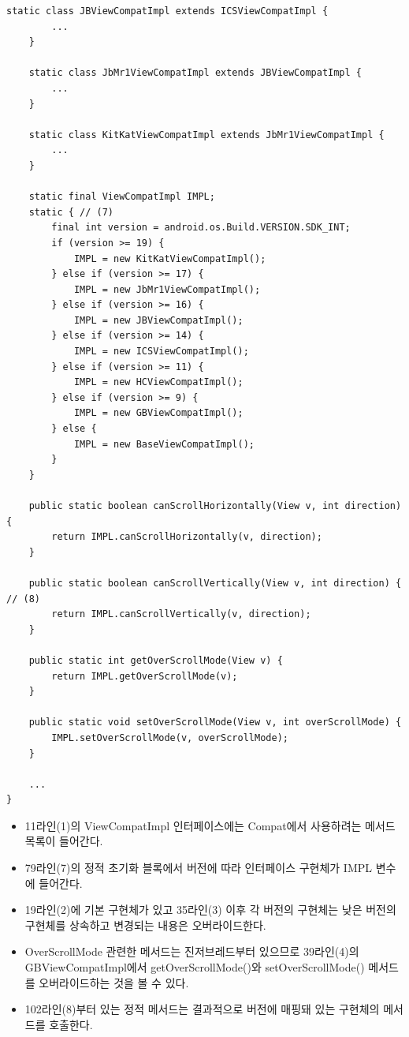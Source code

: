 \begin{lstlisting}[frame=single]
    static class JBViewCompatImpl extends ICSViewCompatImpl {
        ...
    }

    static class JbMr1ViewCompatImpl extends JBViewCompatImpl {
    	...
    }

    static class KitKatViewCompatImpl extends JbMr1ViewCompatImpl {
        ...
    }

    static final ViewCompatImpl IMPL;
    static { // (7)
        final int version = android.os.Build.VERSION.SDK_INT;
        if (version >= 19) {
            IMPL = new KitKatViewCompatImpl();
        } else if (version >= 17) {
            IMPL = new JbMr1ViewCompatImpl();
        } else if (version >= 16) {
            IMPL = new JBViewCompatImpl();
        } else if (version >= 14) {
            IMPL = new ICSViewCompatImpl();
        } else if (version >= 11) {
            IMPL = new HCViewCompatImpl();
        } else if (version >= 9) {
            IMPL = new GBViewCompatImpl();
        } else {
            IMPL = new BaseViewCompatImpl();
        }
    }

    public static boolean canScrollHorizontally(View v, int direction) {
        return IMPL.canScrollHorizontally(v, direction);
    }

    public static boolean canScrollVertically(View v, int direction) { // (8)
        return IMPL.canScrollVertically(v, direction);
    }

    public static int getOverScrollMode(View v) {
        return IMPL.getOverScrollMode(v);
    }

    public static void setOverScrollMode(View v, int overScrollMode) {
        IMPL.setOverScrollMode(v, overScrollMode);
    }

 	...
}

\end{lstlisting}
\begin{itemize}
\item 11라인(1)의 ViewCompatImpl 인터페이스에는 Compat에서 사용하려는 메서드 목록이 들어간다. 
\item 79라인(7)의 정적 초기화 블록에서 버전에 따라 인터페이스 구현체가 IMPL 변수에 들어간다.
\item 19라인(2)에 기본 구현체가 있고 35라인(3) 이후 각 버전의 구현체는 낮은 버전의 구현체를 상속하고 변경되는 내용은 오버라이드한다.
\item OverScrollMode 관련한 메서드는 진저브레드부터 있으므로 39라인(4)의 GBViewCompatImpl에서 getOverScrollMode()와 setOverScrollMode() 메서드를 오버라이드하는 것을 볼 수 있다.
\item 102라인(8)부터 있는 정적 메서드는 결과적으로 버전에 매핑돼 있는 구현체의 메서드를 호출한다.
\end{itemize}

